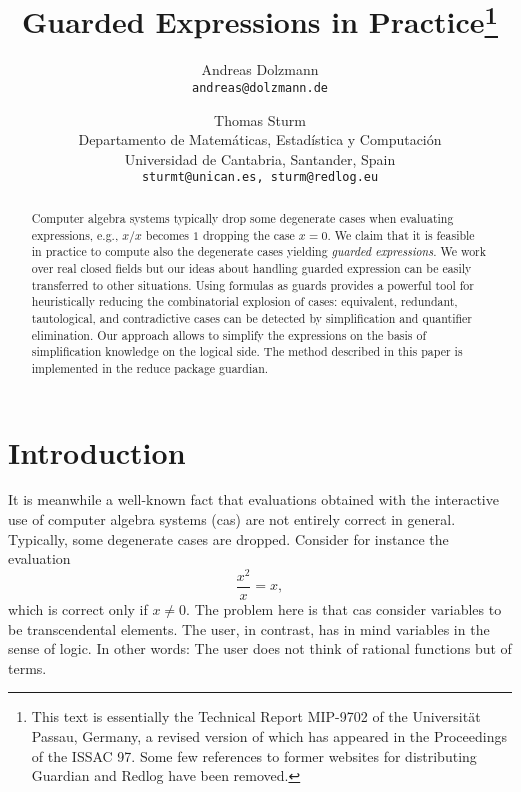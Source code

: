 \newenvironment{gex}{\left[\begin{array}{c|c}}{\end{array}\right]}
\newcommand{\gc}[1]{\mbox{\boldmath$#1$}}
\newcommand{\true}{{\rm T}}
\newcommand{\false}{{\rm F}}
\newcommand{\E}{{\rm E}}
\newcommand{\GE}{{\rm GE}}
\newcommand{\gscheme}{{\rm gscheme}}
\newcommand{\sign}{{\rm sign}}

\title{Guarded Expressions in Practice\thanks{This text is essentially
    the Technical Report MIP-9702 of the Universit\"at Passau, Germany,
    a revised version of which has appeared in the Proceedings of the
    ISSAC 97. Some few references to former websites for distributing
    Guardian and Redlog have been removed.}}
\author{Andreas Dolzmann\\
  {\tt andreas@dolzmann.de} \and
  Thomas Sturm\\
  Departamento de Matem\'aticas, Estad\'istica y Computaci\'on\\
  Universidad de Cantabria, Santander, Spain\\
  \texttt{sturmt@unican.es, sturm@redlog.eu} }
\maketitle
%
\begin{abstract}
Computer algebra systems typically drop some degenerate cases when
evaluating expressions, e.g., $x/x$ becomes $1$ dropping the case
$x=0$. We claim that it is feasible in practice to compute also the
degenerate cases yielding {\em guarded expressions}. We work over real
closed fields but our ideas about handling guarded expression can be
easily transferred to other situations. Using formulas as guards
provides a powerful tool for heuristically reducing the combinatorial
explosion of cases: equivalent, redundant, tautological, and
contradictive cases can be detected by simplification and quantifier
elimination. Our approach allows to simplify the expressions on the
basis of simplification knowledge on the logical side. The method
described in this paper is implemented in the {\sc reduce} package
{\sc guardian}.
\end{abstract}
%
\section{Introduction}
It is meanwhile a well-known fact that evaluations obtained with the
interactive use of computer algebra systems ({\sc cas}) are not
entirely correct in general. Typically, some degenerate cases are
dropped. Consider for instance the evaluation
$$
\frac{x^2}{x}=x,
$$
which is correct only if $x\neq0$.
The problem here is that {\sc cas} consider variables to be
transcendental elements. The user, in contrast, has in mind variables
in the sense of logic. In other words: The user does not think of
rational functions but of terms.

